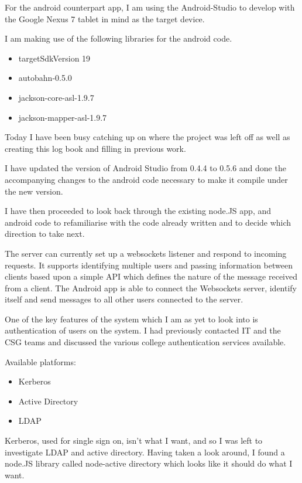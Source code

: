 \documentclass[idxtotoc,hyperref,openany]{labbook} %
\begin{document}
For the android counterpart app, I am using the Android-Studio to develop with the Google Nexus 7 tablet in mind as the target device.

I am making use of the following libraries for the android code.

\begin{itemize}
\item targetSdkVersion 19
\item autobahn-0.5.0
\item jackson-core-asl-1.9.7
\item jackson-mapper-asl-1.9.7
\end{itemize}


Today I have been busy catching up on where the project was left off as well as creating this log book and filling in previous work.

I have updated the version of Android Studio from 0.4.4 to 0.5.6 and done the accompanying changes to the android code necessary to make it compile under the new version.

I have then proceeded to look back through the existing node.JS app, and android code to refamiliarise with the code already written and to decide which direction to take next.

The server can currently set up a websockets listener and respond to incoming requests.  It supports identifying multiple users and passing information between clients based upon a simple API which defines the nature of the message received from a client.  The Android app is able to connect the Websockets server, identify itself and send messages to all other users connected to the server.


One of the key features of the system which I am as yet to look into is authentication of users on the system.  I had previously contacted IT and the CSG teams and discussed the various college authentication services available.

Available platforms:

\begin{itemize}
\item Kerberos
\item Active Directory
\item LDAP
\end{itemize}

Kerberos, used for single sign on, isn't what I want, and so I was left to investigate LDAP and active directory.  Having taken a look around, I found a node.JS library called node-active directory which looks like it should do what I want.
\end{document}
